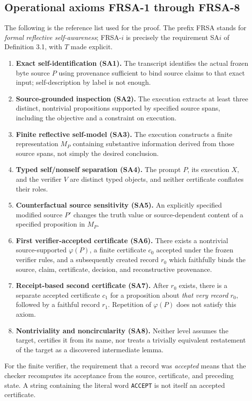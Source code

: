 \documentclass[11pt]{article}
\theoremstyle{remark}
\begin{document}
\subsection{Operational axioms FRSA-1 through FRSA-8}
\label{sec:operational-axioms}
The following is the reference list used for the proof. The prefix FRSA
stands for \emph{formal reflective self-awareness}; FRSA-$i$ is precisely the
requirement SA$i$ of Definition 3.1, with $T$ made explicit.
\begin{enumerate}[label=\textbf{FRSA-\arabic*.},leftmargin=*,itemsep=4pt]
\item \textbf{Exact self-identification (SA1).} The transcript identifies the
actual frozen byte source $P$ using provenance sufficient to bind source
claims to that exact input; self-description by label is not enough.
\item \textbf{Source-grounded inspection (SA2).} The execution extracts at
least three distinct, nontrivial propositions supported by specified source
spans, including the objective and a constraint on execution.
\item \textbf{Finite reflective self-model (SA3).} The execution constructs a
finite representation $M_P$ containing substantive information derived from
those source spans, not simply the desired conclusion.
\item \textbf{Typed self/nonself separation (SA4).} The prompt $P$, its
execution $X$, and the verifier $V$ are distinct typed objects, and neither
certificate conflates their roles.
\item \textbf{Counterfactual source sensitivity (SA5).} An explicitly
specified modified source $P'$ changes the truth value or source-dependent
content of a specified proposition in $M_P$.
\item \textbf{First verifier-accepted certificate (SA6).} There exists a
nontrivial source-supported $\varphi(P)$, a finite certificate $c_0$ accepted
under the frozen verifier rules, and a subsequently created record $r_0$
which faithfully binds the source, claim, certificate, decision, and
reconstructive provenance.
\item \textbf{Receipt-based second certificate (SA7).} After $r_0$ exists,
there is a separate accepted certificate $c_1$ for a proposition about
\emph{that very record} $r_0$, followed by a faithful record $r_1$.
Repetition of $\varphi(P)$ does not satisfy this axiom.
\item \textbf{Nontriviality and noncircularity (SA8).} Neither level assumes
the target, certifies it from its name, nor treats a trivially equivalent
restatement of the target as a discovered intermediate lemma.
\end{enumerate}
For the finite verifier, the requirement that a record was \emph{accepted}
means that the checker recomputes its acceptance from the source, certificate,
and preceding state. A string containing the literal word
\texttt{ACCEPT} is not itself an accepted certificate.
\end{document}
